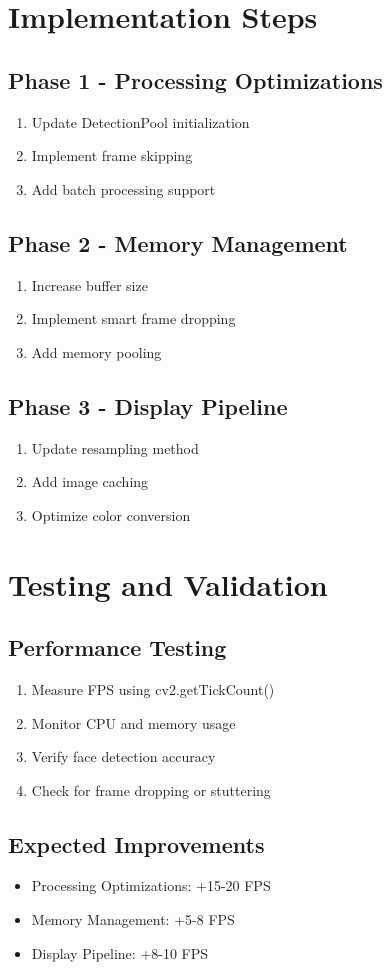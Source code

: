 \section{Implementation Steps}

\subsection{Phase 1 - Processing Optimizations}
\begin{enumerate}
    \item Update DetectionPool initialization
    \item Implement frame skipping
    \item Add batch processing support
\end{enumerate}

\subsection{Phase 2 - Memory Management}
\begin{enumerate}
    \item Increase buffer size
    \item Implement smart frame dropping
    \item Add memory pooling
\end{enumerate}

\subsection{Phase 3 - Display Pipeline}
\begin{enumerate}
    \item Update resampling method
    \item Add image caching
    \item Optimize color conversion
\end{enumerate}

\section{Testing and Validation}

\subsection{Performance Testing}
\begin{enumerate}
    \item Measure FPS using cv2.getTickCount()
    \item Monitor CPU and memory usage
    \item Verify face detection accuracy
    \item Check for frame dropping or stuttering
\end{enumerate}

\subsection{Expected Improvements}
\begin{itemize}
    \item Processing Optimizations: +15-20 FPS
    \item Memory Management: +5-8 FPS
    \item Display Pipeline: +8-10 FPS
\end{itemize}